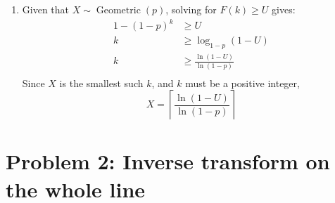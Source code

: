 \documentclass[11pt]{article}
\begin{document}
\begin{enumerate}[label=(\alph*)]
    \item 
    Given that $X \sim \operatorname{Geometric}(p)$, solving for $F(k) \ge U$ gives:
    \begin{align*}
        1-(1-p)^k &\ge U \\
        k &\ge \log_{1-p} (1-U) \\
        k &\ge \frac{\ln(1-U)}{\ln(1-p)} \\
    \end{align*}
    Since $X$ is the smallest such $k$, and $k$ must be a positive integer,
    \[
        X = \left\lceil\frac{\ln(1-U)}{\ln(1-p)}\right\rceil
    \]

\end{enumerate}

\section*{Problem 2: Inverse transform on the whole line}
\end{document}
